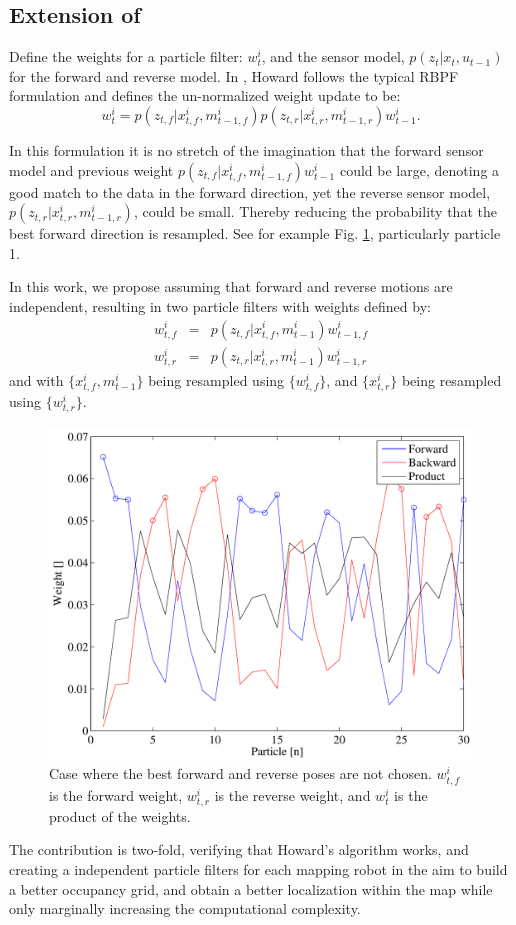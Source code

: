 \subsection{Extension of \cite{howard2006multi}}
\label{SS:Back:Contributions}


Define the weights for a particle filter: $w_t^i$, and the sensor model, $p(z_t|x_t,u_{t-1})$ for the forward and reverse model.  In \cite{howard2006multi}, Howard follows the typical RBPF formulation and defines the un-normalized weight update to be:
\begin{equation}
w^i_t=p(z_{t,f}|x_{t,f}^i,m_{t-1,f}^i) p(z_{t,r}|x_{t,r}^i,m_{t-1,r}^i) w^i_{t-1}.
\label{eq:combinedweight}
\end{equation}

In this formulation it is no stretch of the imagination that the forward sensor model and previous weight $p(z_{t,f}|x_{t,f}^i,m_{t-1,f}^i) w^i_{t-1}$ could be large, denoting a good match to the data in the forward direction, yet the reverse sensor model, $p(z_{t,r}|x_{t,r}^i,m_{t-1,r}^i)$, could be small.  Thereby reducing the probability that the best forward direction is resampled.  See for example Fig. \ref{fig:deplete}, particularly particle 1.


In this work, we propose assuming that forward and reverse motions are independent, resulting in two particle filters with weights defined by:
\begin{eqnarray}
w^i_{t,f}&=&p(z_{t,f}|x_{t,f}^i,m_{t-1}^i)  w^i_{t-1,f}\\
w^i_{t,r}&=&p(z_{t,r}|x_{t,r}^i,m_{t-1}^i)  w^i_{t-1,r}
\end{eqnarray}
and with $\{x_{t,f}^i,m_{t-1}^i\}$ being resampled using $\{w^i_{t,f}\}$, and $\{x_{t,r}^i\}$ being resampled using $\{w^i_{t,r}\}$.  


\begin{figure}[h]
\centering
\includegraphics[width=\columnwidth]{../FinalFigures/Depletion}
\caption{Case where the best forward and reverse poses are not chosen. $w^i_{t,f}$ is the forward weight, $w^i_{t,r}$ is the reverse weight, and $w^i_t$ is the product of the weights.}
\label{fig:deplete}
\end{figure}

The contribution is two-fold, verifying that Howard's algorithm works, and creating a independent particle filters for each mapping robot in the aim to build a better occupancy grid, and obtain a better localization within the map while only marginally increasing the computational complexity.

